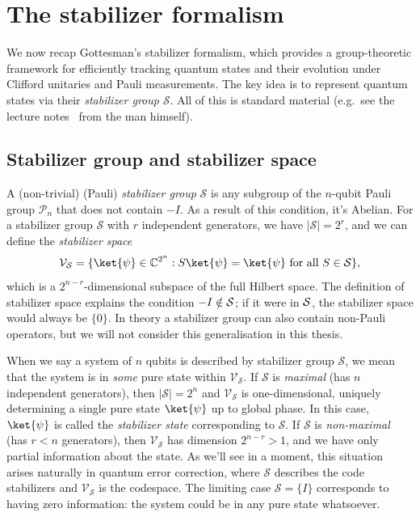 \section{The stabilizer formalism}\label{sec:stabilizer_formalism}

We now recap Gottesman's stabilizer formalism, which provides a group-theoretic framework for efficiently tracking quantum states and their evolution under Clifford unitaries and Pauli measurements.
The key idea is to represent quantum states via their \emph{stabilizer group} $\mathcal{S}$.
All of this is standard material (e.g.\ see the lecture notes~\cite{gottesman2024surviving} from the man himself).

\subsection{Stabilizer group and stabilizer space}\label{subsec:stabilizer-group}

A (non-trivial) (Pauli) \emph{stabilizer group} $\mathcal{S}$ is any subgroup of the $n$-qubit Pauli group $\mathcal{P}_n$ that does not contain $-I$.
As a result of this condition, it's Abelian.
For a stabilizer group $\mathcal{S}$ with $r$ independent generators, we have $|\mathcal{S}| = 2^r$, and we can define the \emph{stabilizer space}
\begin{equation}
\mathcal{V}_{\mathcal{S}} = \{ \ket{\psi} \in \mathbb{C}^{2^n} : S \ket{\psi} = \ket{\psi} \text{ for all } S \in \mathcal{S} \},
\end{equation}
which is a $2^{n-r}$-dimensional subspace of the full Hilbert space.
The definition of stabilizer space explains the condition $-I \notin \mathcal{S}$; if it were in $\mathcal{S}$, the stabilizer space would always be $\{0\}$.
In theory a stabilizer group can also contain non-Pauli operators, but we will not consider this generalisation in this thesis.

When we say a system of $n$ qubits is described by stabilizer group $\mathcal{S}$, we mean that the system is in \emph{some} pure state within $\mathcal{V}_{\mathcal{S}}$.
If $\mathcal{S}$ is \emph{maximal} (has $n$ independent generators), then $|\mathcal{S}| = 2^n$ and $\mathcal{V}_{\mathcal{S}}$ is one-dimensional, uniquely determining a single pure state $\ket{\psi}$ up to global phase.
In this case, $\ket{\psi}$ is called the \emph{stabilizer state} corresponding to $\mathcal{S}$.
If $\mathcal{S}$ is \emph{non-maximal} (has $r < n$ generators), then $\mathcal{V}_{\mathcal{S}}$ has dimension $2^{n-r} > 1$, and we have only partial information about the state.
As we'll see in a moment, this situation arises naturally in quantum error correction, where $\mathcal{S}$ describes the code stabilizers and $\mathcal{V}_{\mathcal{S}}$ is the codespace.
The limiting case $\mathcal{S} = \{I\}$ corresponds to having zero information: the system could be in any pure state whatsoever.


